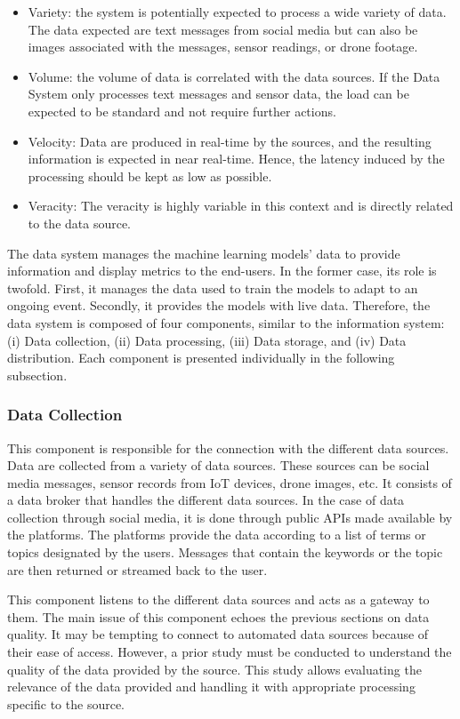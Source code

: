 \begin{itemize}
    \item Variety: the system is potentially expected to process a wide variety of data.
          The data expected are text messages from social media but can also be images associated with the messages, sensor readings, or drone footage.
    \item Volume: the volume of data is correlated with the data sources.
          If the Data System only processes text messages and sensor data, the load can be expected to be standard and not require further actions.
    \item Velocity: Data are produced in real-time by the sources, and the resulting information is expected in near real-time.
          Hence, the latency induced by the processing should be kept as low as possible.
    \item Veracity: The veracity is highly variable in this context and is directly related to the data source.
\end{itemize}

The data system manages the machine learning models' data to provide information and display metrics to the end-users.
In the former case, its role is twofold.
First, it manages the data used to train the models to adapt to an ongoing event.
Secondly, it provides the models with live data.
Therefore, the data system is composed of four components, similar to the information system: (i) Data collection, (ii) Data processing, (iii) Data storage, and (iv) Data distribution.
Each component is presented individually in the following subsection.

\subsubsection{Data Collection}
This component is responsible for the connection with the different data sources.
Data are collected from a variety of data sources.
These sources can be social media messages, sensor records from IoT devices, drone images, etc.
It consists of a data broker that handles the different data sources.
In the case of data collection through social media, it is done through public APIs made
available by the platforms.
The platforms provide the data according to a list of terms or topics designated by the users.
Messages that contain the keywords or the topic are then returned or streamed back to the user.

This component listens to the different data sources and acts as a gateway to them.
The main issue of this component echoes the previous sections on data quality.
It may be tempting to connect to automated data sources because of their ease of access.
However, a prior study must be conducted to understand the quality of the data provided by the source.
This study allows evaluating the relevance of the data provided and handling it with appropriate processing specific to the source.

